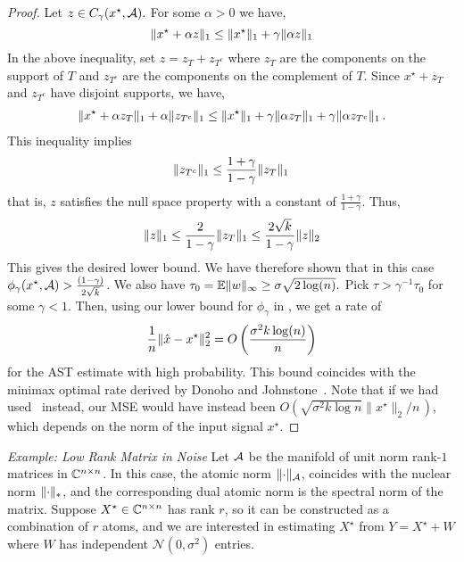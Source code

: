 \begin{proof}
Let $z \in C_\gamma(x^\star,\mathcal{A}).$ For some $\alpha>0$ we have,
\[
\lVert x^\star + \alpha z\rVert_1 \leq \lVert x^\star\rVert_1 + \gamma \lVert\alpha z\rVert_1
\]
In the above inequality, set $z = z_T + z_{T^c}$ where $z_T$ are the components on the support of $T$ and $z_{T^c} $ are the components on the complement of $T$. Since $x^\star + z_T$ and $z_{T^c}$ have disjoint supports, we have,
\begin{align*}
\lVert x^\star + \alpha z_T\rVert_1 + \alpha \lVert z_{T^c}\rVert_1 \leq \lVert x^\star\rVert_1 + \gamma \lVert\alpha z_T\rVert_1 + \gamma \lVert\alpha z_{T^c}\rVert_1\,.
\end{align*}
This inequality  implies
\begin{align*}
 \lVert z_{T^c}\rVert_1 \leq \frac{1+\gamma}{1-\gamma} \lVert z_T\rVert_1\,
\end{align*}
that is, $z$ satisfies the null space property with a constant of $\tfrac{1+\gamma}{1-\gamma}.$ Thus,
\[
\lVert z\rVert_1 \leq \frac{2}{1-\gamma}\lVert z_T\rVert_1 \leq \frac{2\sqrt{k}}{1-\gamma}\lVert z\rVert_2
\]
This gives the desired lower bound.  We have therefore shown that in this case $\phi_\gamma(x^\star,\mathcal{A})
>\frac{(1-\gamma)}{2\sqrt{k}}$. We also have $\tau_0 = \operatorname{\mathbb{E}} \lVert w\rVert_\infty \geq
\sigma\sqrt{2\log(n)}.$ Pick $\tau > \gamma^{-1} \tau_0$ for some $\gamma < 1.$
Then, using our lower bound for $\phi_\gamma$ in , we get a
rate of
\begin{align}\label{eq:sparse-fast-rate}
\frac{1}{n}\lVert\hat{x}-x^\star\rVert_2^2 = O\left(\frac{\sigma^2 k\log(n)}{n}\right)
\end{align}
for the AST estimate with high probability. This bound coincides with
the minimax optimal rate derived by Donoho and Johnstone~\cite{Donoho94}. Note
that if we had used~ instead, our MSE would have
instead been $O\left(\sqrt{\sigma^2 k\log n}\|x^\star\|_2/n\,
\right)$, which depends on the norm of the input signal $x^\star$.
\end{proof}

\emph{Example: Low Rank Matrix in Noise}
Let $\mathcal{A}$ be the manifold of unit norm rank-$1$ matrices in $\mathbb{C}^{n\times n}$. In
this case, the atomic norm $\lVert\cdot\rVert_{\mathcal{A}}$, coincides with the nuclear norm
$\lVert\cdot\rVert_*$, and the corresponding dual atomic norm is the spectral norm
of the matrix. Suppose $X^\star \in \mathbb{C}^{n\times n}$ has rank $r$, so it can be
constructed as a combination of $r$ atoms, and we are interested in estimating
$X^\star$ from $Y = X^\star + W$ where $W$ has independent
$\mathcal{N}(0,\sigma^2)$ entries.

